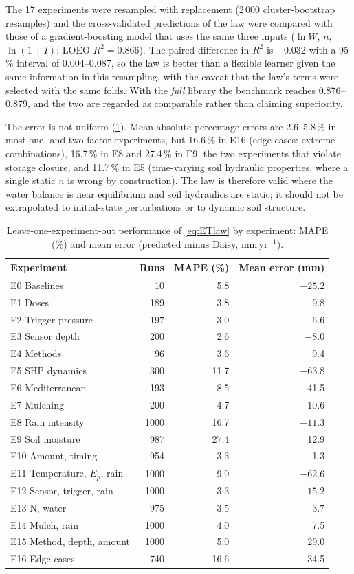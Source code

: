 The 17 experiments were resampled with replacement (2\,000 cluster-bootstrap resamples) and the cross-validated predictions of the law were compared with those of a gradient-boosting model that uses the same three inputs ($\ln W$, $n$, $\ln(1+I)$; LOEO $R^2=0.866$). The paired difference in $R^2$ is $+0.032$ with a 95\,\% interval of 0.004--0.087, so the law is better than a flexible learner given the same information in this resampling, with the caveat that the law's terms were selected with the same folds. With the \emph{full} library the benchmark reaches 0.876--0.879, and the two are regarded as comparable rather than claiming superiority.

The error is not uniform (\cref{tab:byexp}). Mean absolute percentage errors are 2.6--5.8\,\% in most one- and two-factor experiments, but 16.6\,\% in E16 (edge cases: extreme combinations), 16.7\,\% in E8 and 27.4\,\% in E9, the two experiments that violate storage closure, and 11.7\,\% in E5 (time-varying soil hydraulic properties, where a single static $n$ is wrong by construction). The law is therefore valid where the water balance is near equilibrium and soil hydraulics are static; it should not be extrapolated to initial-state perturbations or to dynamic soil structure.

\begin{table}[H]\centering\small
\caption{Leave-one-experiment-out performance of \cref{eq:ETlaw} by experiment: MAPE (\%) and mean error (predicted minus Daisy, mm\,yr$^{-1}$).}
\label{tab:byexp}
\begin{tabular}{lrrr}
\toprule
Experiment & Runs & MAPE (\%) & Mean error (mm)\\\midrule
E0 Baselines & 10 & 5.8 & $-25.2$\\
E1 Doses & 189 & 3.8 & 9.8\\
E2 Trigger pressure & 197 & 3.0 & $-6.6$\\
E3 Sensor depth & 200 & 2.6 & $-8.0$\\
E4 Methods & 96 & 3.6 & 9.4\\
E5 SHP dynamics & 300 & 11.7 & $-63.8$\\
E6 Mediterranean & 193 & 8.5 & 41.5\\
E7 Mulching & 200 & 4.7 & 10.6\\
E8 Rain intensity & 1000 & 16.7 & $-11.3$\\
E9 Soil moisture & 987 & 27.4 & 12.9\\
E10 Amount, timing & 954 & 3.3 & 1.3\\
E11 Temperature, $E_p$, rain & 1000 & 9.0 & $-62.6$\\
E12 Sensor, trigger, rain & 1000 & 3.3 & $-15.2$\\
E13 N, water & 975 & 3.5 & $-3.7$\\
E14 Mulch, rain & 1000 & 4.0 & 7.5\\
E15 Method, depth, amount & 1000 & 5.0 & 29.0\\
E16 Edge cases & 740 & 16.6 & 34.5\\\bottomrule
\end{tabular}
\end{table}

